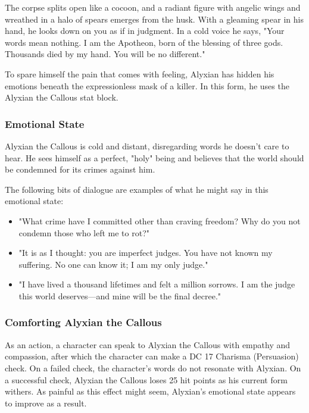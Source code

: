 \documentclass[10pt,a4paper,twoside,bg=print,twocolumn,openany,nodeprecatedcode]{dndbook}
\begin{document}
\begin{DndReadAloud}{}
The corpse splits open like a cocoon, and a radiant figure with angelic wings and wreathed in a halo of spears emerges from the husk. With a gleaming spear in his hand, he looks down on you as if in judgment. In a cold voice he says, "Your words mean nothing. I am the Apotheon, born of the blessing of three gods. Thousands died by my hand. You will be no different."

\end{DndReadAloud}

To spare himself the pain that comes with feeling, Alyxian has hidden his emotions beneath the expressionless mask of a killer. In this form, he uses the Alyxian the Callous stat block.

\subsubsection{Emotional State}
Alyxian the Callous is cold and distant, disregarding words he doesn't care to hear. He sees himself as a perfect, "holy" being and believes that the world should be condemned for its crimes against him.

The following bits of dialogue are examples of what he might say in this emotional state:

\begin{itemize}
\item "What crime have I committed other than craving freedom? Why do you not condemn those who left me to rot?"
\item "It is as I thought: you are imperfect judges. You have not known my suffering. No one can know it; I am my only judge."
\item "I have lived a thousand lifetimes and felt a million sorrows. I am the judge this world deserves—and mine will be the final decree."
\end{itemize}


\subsubsection{Comforting Alyxian the Callous}
As an action, a character can speak to Alyxian the Callous with empathy and compassion, after which the character can make a DC 17 Charisma (Persuasion) check. On a failed check, the character's words do not resonate with Alyxian. On a successful check, Alyxian the Callous loses 25 hit points as his current form withers. As painful as this effect might seem, Alyxian's emotional state appears to improve as a result.
\end{document}
